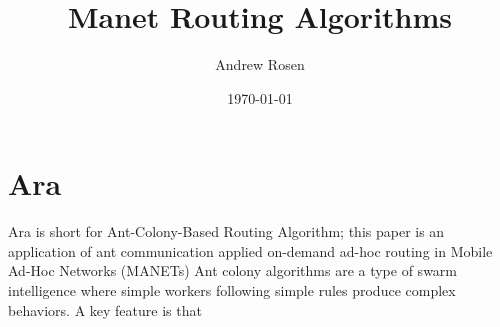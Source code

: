 \documentclass[a4paper]{article}
\title{Manet Routing Algorithms}
\author{Andrew Rosen}
\date{\today}
\begin{document}
\maketitle
\section{Ara}
Ara is short for Ant-Colony-Based Routing Algorithm; this paper is an application of ant communication applied on-demand ad-hoc routing in Mobile Ad-Hoc Networks (MANETs)
Ant colony algorithms are a type of swarm intelligence where simple workers following simple rules produce complex behaviors.  A key feature is that 
\end{document}
